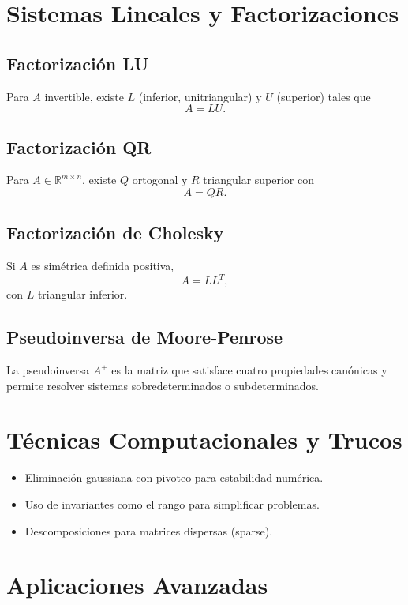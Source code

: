 \documentclass{article}
\begin{document}
\section{Sistemas Lineales y Factorizaciones}

\subsection{Factorización LU}
Para \( A \) invertible, existe \( L \) (inferior, unitriangular) y \( U \) (superior) tales que
\[
A = LU.
\]


\subsection{Factorización QR}
Para \( A \in \mathbb{R}^{m \times n} \), existe \( Q \) ortogonal y \( R \) triangular superior con
\[
A = QR.
\]


\subsection{Factorización de Cholesky}
Si \( A \) es simétrica definida positiva,
\[
A = LL^T,
\]
con \( L \) triangular inferior.


\subsection{Pseudoinversa de Moore-Penrose}
La pseudoinversa \( A^+ \) es la matriz que satisface cuatro propiedades canónicas y permite resolver sistemas sobredeterminados o subdeterminados.


\section{Técnicas Computacionales y Trucos}

\begin{itemize}
    \item Eliminación gaussiana con pivoteo para estabilidad numérica.
    \item Uso de invariantes como el rango para simplificar problemas.
    \item Descomposiciones para matrices dispersas (sparse).
\end{itemize}

\section{Aplicaciones Avanzadas}
\end{document}
